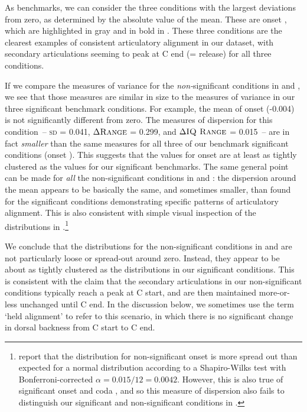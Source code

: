 \documentclass[output=paper,colorlinks,citecolor=brown]{langscibook}
\newcommand{\pal}{\ipa{ʲ}}
\newcommand{\vel}{\ipa{ˠ}}
\begin{document}
As benchmarks, we can consider the three conditions with the largest deviations from zero, as determined by the absolute value of the mean. These are onset \ipa{/P\vel\ T\pal\ K\pal/}, which are highlighted in gray and in bold in . These three conditions are the clearest examples of consistent articulatory alignment in our dataset, with secondary articulations seeming to peak at C end (= release) for all three conditions.

If we compare the measures of variance for the \emph{non-}significant conditions in  and , we see that those measures are similar in size to the measures of variance in our three significant benchmark conditions. For example, the mean of onset \ipa{/T\vel/} (-0.004) is not significantly different from zero. The measures of dispersion for this condition~-- \textsc{sd} = 0.041, $\Delta\textsc{Range}$ = 0.299, and $\Delta\textsc{IQ Range}$ = 0.015~-- are in fact \emph{smaller} than the same measures for all three of our benchmark significant conditions (onset \ipa{/P\vel\ T\pal\ K\pal/}). This suggests that the values for onset \ipa{/T\vel/} are at least as tightly clustered as the values for our significant benchmarks. The same general point can be made for \emph{all} the non-significant conditions in  and : the dispersion around the mean appears to be basically the same, and sometimes smaller, than found for the significant conditions demonstrating specific patterns of articulatory alignment. This is also consistent with simple visual inspection of the distributions in .\footnote{\citet{Padgett_etal2023_Irish_pal_syllpos} report that the distribution for non-significant onset \ipa{/T\vel/} is more spread out than expected for a normal distribution according to a Shapiro-Wilks test with Bonferroni-corrected $\alpha = 0.015/12 = 0.0042$. However, this is also true of significant onset \ipa{/P\pal\ P\vel\ T\pal/} and coda \ipa{/T\pal/}, and so this measure of dispersion also fails to distinguish our significant and non-significant conditions in .}

We conclude that the distributions for the non-significant conditions in  and  are not particularly loose or spread-out around zero. Instead, they appear to be about as tightly clustered as the distributions in our significant conditions. This is consistent with the claim that the secondary articulations in our non-significant conditions typically reach a peak at C start, and are then maintained more-or-less unchanged until C end. In the discussion below, we sometimes use the term `held alignment' to refer to this scenario, in which there is no significant change in dorsal backness from C start to C end.
\end{document}
